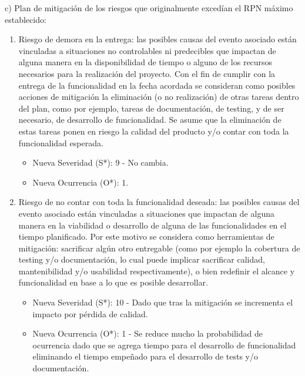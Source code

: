 \documentclass[
11pt, %
]{charter}
\begin{document}
\vspace{2em}

c) Plan de mitigación de los riesgos que originalmente excedían el RPN máximo establecido:
\begin{enumerate}
	\item Riesgo de demora en la entrega: las posibles causas del evento asociado están vinculadas a situaciones no controlables ni predecibles que impactan de alguna manera en la disponibilidad de tiempo o alguno de los recursos necesarios para la realización del proyecto. Con el fin de cumplir con la entrega de la funcionalidad en la fecha acordada se consideran como posibles acciones de mitigación la eliminación (o no realización) de otras tareas dentro del plan, como por ejemplo, tareas de documentación, de testing, y de ser necesario, de desarrollo de funcionalidad. Se asume que la eliminación de estas tareas ponen en riesgo la calidad del producto y/o contar con toda la funcionalidad esperada.
	\begin{itemize}
		\item Nueva Severidad (S*): 9 - No cambia.
		\item Nueva Ocurrencia (O*): 1.
	\end{itemize}
	
	\item Riesgo de no contar con toda la funcionalidad deseada: las posibles causas del evento asociado están vinculadas a situaciones que impactan de alguna manera en la viabilidad o desarrollo de alguna de las funcionalidades en el tiempo planificado. Por este motivo se considera como herramientas de mitigación: sacrificar algún otro entregable (como por ejemplo la cobertura de testing y/o documentación, lo cual puede implicar sacrificar calidad, mantenibilidad y/o usabilidad respectivamente), o bien redefinir el alcance y funcionalidad en base a lo que es posible desarrollar.
	\begin{itemize}
		\item Nueva Severidad (S*): 10 - Dado que tras la mitigación se incrementa el impacto por pérdida de calidad.
		\item Nueva Ocurrencia (O*): 1 - Se reduce mucho la probabilidad de ocurrencia dado que se agrega tiempo para el desarrollo de funcionalidad eliminando el tiempo empeñado para el desarrollo de tests y/o documentación.
	\end{itemize}
	

\end{enumerate}
\end{document}
